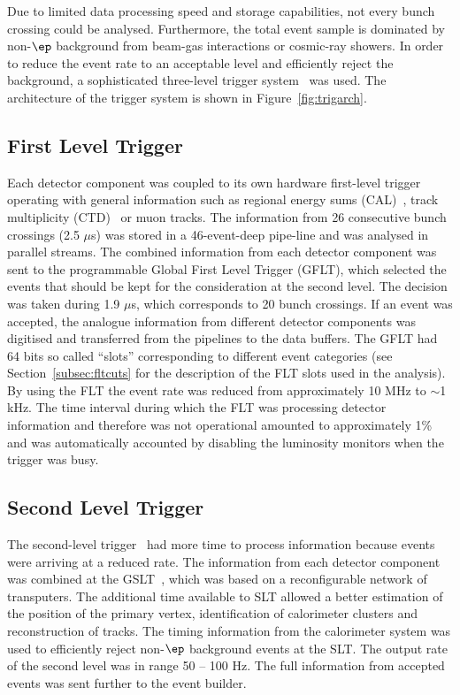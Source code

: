Due to limited data processing speed and storage capabilities, not every bunch crossing could be analysed. Furthermore, the total event sample is dominated by non-$\ep$ background from beam-gas interactions or cosmic-ray showers. In order to reduce the event rate to an acceptable level and efficiently reject the background, a sophisticated three-level trigger system~\cite{Smith:1992im,nim:a379:542,Carlin:1995rv} was used. The architecture of the \zeus trigger system is shown in Figure~\ref{fig:trigarch}. 

\subsection{First Level Trigger}
\label{subsec:flt} Each detector component was coupled to its own hardware first-level trigger operating with general information such as regional energy sums (CAL)~\cite{nim:a355:278}, track multiplicity (CTD)~\cite{nim:a315:431} or muon tracks. The information from 26 consecutive bunch crossings (2.5 $\mu$s) was stored in a 46-event-deep pipe-line and was analysed in parallel streams. The combined information from each detector component was sent to the programmable Global First Level Trigger (GFLT), which selected the events that should be kept for the consideration at the second level. The decision was taken during 1.9 $\mu$s, which corresponds to 20 bunch crossings. If an event was accepted, the analogue information from different detector components was digitised and transferred from the pipelines to the data buffers. The GFLT had 64 bits so called ``slots'' corresponding to different event categories (see Section~\ref{subsec:fltcuts} for the description of the FLT slots used in the analysis). By using the FLT the event rate was reduced from approximately 10 MHz to $\sim$1 kHz. The time interval during which the FLT was processing detector information and therefore was not operational amounted to approximately 1\% and was automatically accounted by disabling the luminosity monitors when the trigger was busy.

\subsection{Second Level Trigger}
\label{subsec:slt}
The second-level trigger~\cite{Allfrey:2007zz} had more time to process information because events were arriving at a reduced rate. The information from each detector component was combined at the GSLT~\cite{upub:abbiendi:zn99063,upub:chlebana:zn94102,Uijterwaal:1992xc}, which was based on a reconfigurable network of transputers. The additional time available to SLT allowed a better estimation of the position of the primary vertex, identification of  calorimeter clusters and reconstruction of tracks. The timing information from the calorimeter system was used to efficiently reject non-$\ep$ background events at the SLT. The output rate of the second level was in range 50 -- 100 Hz. The full information from accepted events was sent further to the event builder.

